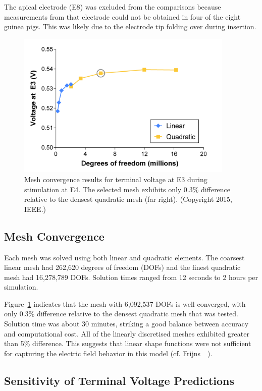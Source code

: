 The apical electrode (E8) was excluded from the comparisons because measurements
from that electrode could not be obtained in four of the eight guinea pigs. This
was likely due to the electrode tip folding over during insertion.

\begin{figure}[p]
	\centering
	\includegraphics[height=7cm]{Validation/convergence_circled}
	\caption[Mesh convergence results]{Mesh convergence results for terminal voltage
	at E3 during stimulation at E4. The selected mesh exhibits only 0.3\% difference
	relative to the densest quadratic mesh (far right). (Copyright \textcopyright{}
	2015, IEEE.)}
	\label{fig:mesh_convergence}
\end{figure}

\subsection{Mesh Convergence}
\label{sect:mesh_convergence}

Each mesh was solved using both linear and quadratic elements. The coarsest
linear mesh had 262,620 degrees of freedom (DOFs) and the finest quadratic mesh
had 16,278,789 DOFs. Solution times ranged from 12 seconds to 2 hours per
simulation.

Figure~\ref{fig:mesh_convergence} indicates that the mesh with 6,092,537 DOFs is
well converged, with only 0.3\% difference relative to the densest quadratic
mesh that was tested. Solution time was about 30 minutes, striking a good
balance between accuracy and computational cost. All of the linearly discretised
meshes exhibited greater than 5\% difference. This suggests that linear shape
functions were not sufficient for capturing the electric field behavior in this
model (cf. Frijns~\etal~\cite{frijns1995}).

\subsection{Sensitivity of Terminal Voltage Predictions}

